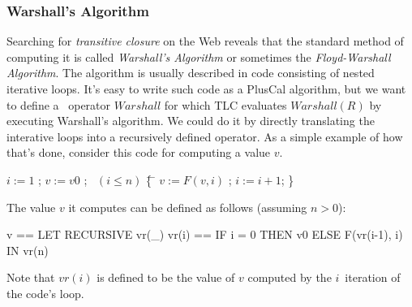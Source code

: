 \documentclass[fleqn,leqno]{article}
\begin{document}
\subsubsection[Warshall's Algorithm]{Warshall's 
Algorithm}

Searching for \emph{transitive closure} on the Web reveals that the
standard method of computing it is called \emph{Warshall's Algorithm}
or sometimes the \emph{Floyd-Warshall Algorithm}.  The algorithm is
usually described in code consisting of nested iterative loops.  It's
easy to write such code as a PlusCal algorithm, but we want to define
a \tlaplus\ operator $Warshall$ for which TLC evaluates $Warshall(R)$
by executing Warshall's algorithm.  We could do it by directly
translating the interative loops into a recursively defined operator.
As a simple example of how that's done, consider this code for
computing a value $v$.
\begin{display}
\begin{tabbing}
$i := 1$ ;    
$v := v0$ ;  
\pwhile\ $(i \leq n)$ \= \{ 
    \=\+\+ $v := F(v, i)$ ; 
       $i := i+1 $; \}
\end{tabbing}
\end{display}
The value $v$ it computes can be defined as follows (assuming $n>0$):
\begin{display}
\begin{notla}
v == LET RECURSIVE vr(_) 
         vr(i) == IF i = 0 THEN v0 ELSE F(vr(i-1), i)
     IN vr(n)
\end{notla}
\begin{tlatex}
%
%
\end{tlatex}
\end{display}
Note that $vr(i)$ is defined to be the value of $v$ computed by the
$i$\tth\ iteration of the code's loop.  
\end{document}
